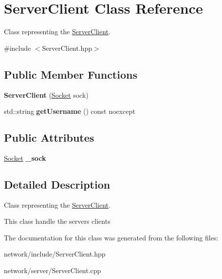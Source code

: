 \hypertarget{class_server_client}{}\section{Server\+Client Class Reference}
\label{class_server_client}


Class representing the \hyperlink{class_server_client}{Server\+Client}.  




{\ttfamily \#include $<$Server\+Client.\+hpp$>$}

\subsection*{Public Member Functions}
\begin{DoxyCompactItemize}
\item 
\mbox{\label{class_server_client_a8598a1d9718e6e9b44b907c29adb6ab4}} 
{\bfseries Server\+Client} (\hyperlink{class_socket}{Socket} sock)
\item 
\mbox{\label{class_server_client_a2eb72f997cdd9e2294e7ad4e4e32f83e}} 
std\+::string {\bfseries get\+Username} () const noexcept
\end{DoxyCompactItemize}
\subsection*{Public Attributes}
\begin{DoxyCompactItemize}
\item 
\mbox{\label{class_server_client_a9aafd3f8ae06874dcad8362080f0c117}} 
\hyperlink{class_socket}{Socket} {\bfseries \+\_\+sock}
\end{DoxyCompactItemize}


\subsection{Detailed Description}
Class representing the \hyperlink{class_server_client}{Server\+Client}. 

This class handle the server\textquotesingle{}s clients 

The documentation for this class was generated from the following files\+:\begin{DoxyCompactItemize}
\item 
network/include/Server\+Client.\+hpp\item 
network/server/Server\+Client.\+cpp\end{DoxyCompactItemize}
